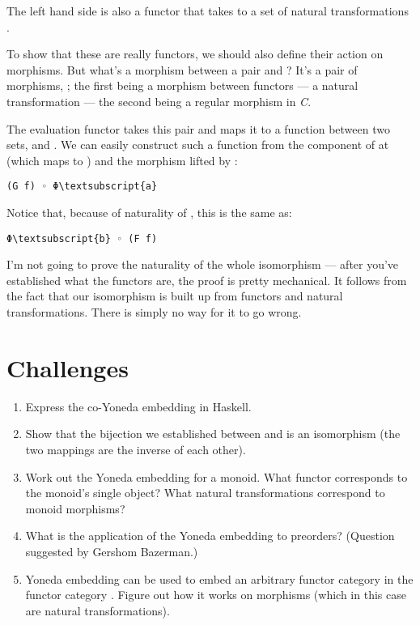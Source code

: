 The left hand side is also a functor that takes  to a
set of natural transformations .

To show that these are really functors, we should also define their
action on morphisms. But what's a morphism between a pair
 and ? It's a pair of morphisms,
; the first being a morphism between functors --- a
natural transformation --- the second being a regular morphism in
\emph{C}.

The evaluation functor takes this pair  and maps it to a
function between two sets,  and . We can
easily construct such a function from the component of  at
 (which maps  to ) and the morphism
 lifted by :

\begin{Verbatim}[commandchars=\\\{\}]
(G f) ◦ Φ\textsubscript{a}
\end{Verbatim}
Notice that, because of naturality of , this is the same as:

\begin{Verbatim}[commandchars=\\\{\}]
Φ\textsubscript{b} ◦ (F f)
\end{Verbatim}
I'm not going to prove the naturality of the whole isomorphism --- after
you've established what the functors are, the proof is pretty
mechanical. It follows from the fact that our isomorphism is built up
from functors and natural transformations. There is simply no way for it
to go wrong.

\section{Challenges}\label{challenges}

\begin{enumerate}
\tightlist
\item
  Express the co-Yoneda embedding in Haskell.
\item
  Show that the bijection we established between  and
   is an isomorphism (the two mappings are the inverse of
  each other).
\item
  Work out the Yoneda embedding for a monoid. What functor corresponds
  to the monoid's single object? What natural transformations correspond
  to monoid morphisms?
\item
  What is the application of the  Yoneda embedding to
  preorders? (Question suggested by Gershom Bazerman.)
\item
  Yoneda embedding can be used to embed an arbitrary functor category
  \code{{[}C, D{]}} in the functor category
  \code{{[}{[}C, D{]}, Set{]}}. Figure out how it works on morphisms
  (which in this case are natural transformations).
\end{enumerate}